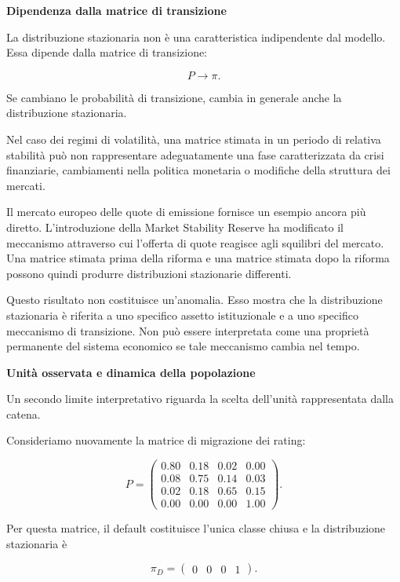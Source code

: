 \noindent\textbf{Dipendenza dalla matrice di transizione}

La distribuzione stazionaria non \`{e} una caratteristica indipendente
dal modello. Essa dipende dalla matrice di transizione:

\[
P
\longrightarrow
\pi.
\]

Se cambiano le probabilit\`{a} di transizione, cambia in generale anche
la distribuzione stazionaria.

Nel caso dei regimi di volatilit\`{a}, una matrice stimata in un periodo
di relativa stabilit\`{a} pu\`{o} non rappresentare adeguatamente una
fase caratterizzata da crisi finanziarie, cambiamenti nella politica
monetaria o modifiche della struttura dei mercati.

Il mercato europeo delle quote di emissione fornisce un esempio ancora
pi\`{u} diretto. L'introduzione della Market Stability Reserve ha
modificato il meccanismo attraverso cui l'offerta di quote reagisce
agli squilibri del mercato. Una matrice stimata prima della riforma e
una matrice stimata dopo la riforma possono quindi produrre
distribuzioni stazionarie differenti.

Questo risultato non costituisce un'anomalia. Esso mostra che la
distribuzione stazionaria \`{e} riferita a uno specifico assetto
istituzionale e a uno specifico meccanismo di transizione. Non pu\`{o}
essere interpretata come una propriet\`{a} permanente del sistema
economico se tale meccanismo cambia nel tempo.

\noindent\textbf{Unit\`{a} osservata e dinamica della popolazione}

Un secondo limite interpretativo riguarda la scelta dell'unit\`{a}
rappresentata dalla catena.

Consideriamo nuovamente la matrice di migrazione dei rating:

\[
P=
\begin{pmatrix}
0.80 & 0.18 & 0.02 & 0.00\\
0.08 & 0.75 & 0.14 & 0.03\\
0.02 & 0.18 & 0.65 & 0.15\\
0.00 & 0.00 & 0.00 & 1.00
\end{pmatrix}.
\]

Per questa matrice, il default costituisce l'unica classe chiusa e la
distribuzione stazionaria \`{e}

\[
\pi_D
=
\begin{pmatrix}
0&0&0&1
\end{pmatrix}.
\]

